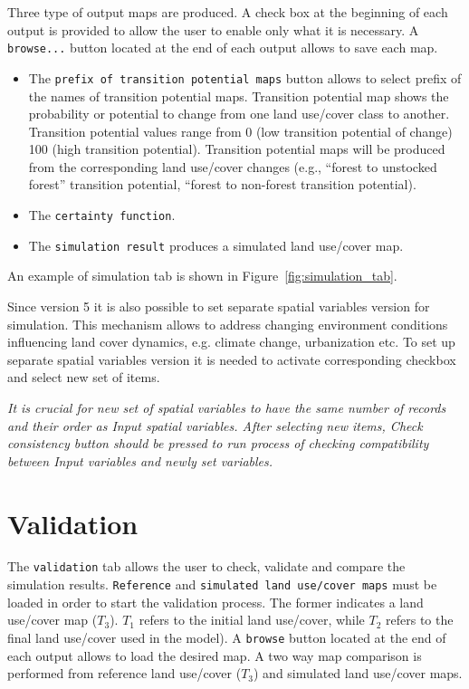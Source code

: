 \documentclass{report}
\begin{document}
Three type of output maps are produced. A check box at the beginning of each output is provided to
allow the user to enable only what it is necessary. A \verb+browse...+ button located at the end of each
output allows to save each map.

\begin{itemize}
  \item The \verb+prefix of transition potential maps+ button allows to select prefix of the names of
    transition potential maps. Transition potential map shows the probability or potential to
    change from one land use/cover class to another. Transition potential values range from 0
    (low transition potential of change) 100 (high transition potential). Transition potential maps
    will be produced from the corresponding land use/cover changes (e.g., “forest to unstocked
    forest” transition potential, “forest to non-forest transition potential).
  \item The \verb+certainty function+.
  \item The \verb+simulation result+ produces a simulated land use/cover map.
\end{itemize}

An example of simulation tab is shown in Figure~\ref{fig:simulation_tab}.

Since version 5 it is also possible to set separate spatial variables version for simulation. This mechanism allows to address changing environment conditions influencing land cover dynamics, e.g. climate change, urbanization etc. To set up separate spatial variables version it is needed to activate corresponding checkbox and select new set of items.

\emph{It is crucial for new set of spatial variables to have the same number of records and their order as Input spatial variables. After selecting new items, Check consistency button should be pressed to run process of checking compatibility between Input variables and newly set variables.}

\section{Validation}

The \verb+validation+ tab allows the user to check, validate and compare the simulation results. 
\verb+Reference+ and \verb+simulated land use/cover maps+ must be loaded in order 
to start the validation process. The
former indicates a land use/cover map ($T_3$). $T_1$ refers to the initial land use/cover, while $T_2$ refers to
the final land use/cover used in the model). A \verb+browse+ button located at the end of each output
allows to load the desired map. A two way map comparison is performed from reference land
use/cover ($T_3$) and simulated land use/cover maps.
\end{document}

